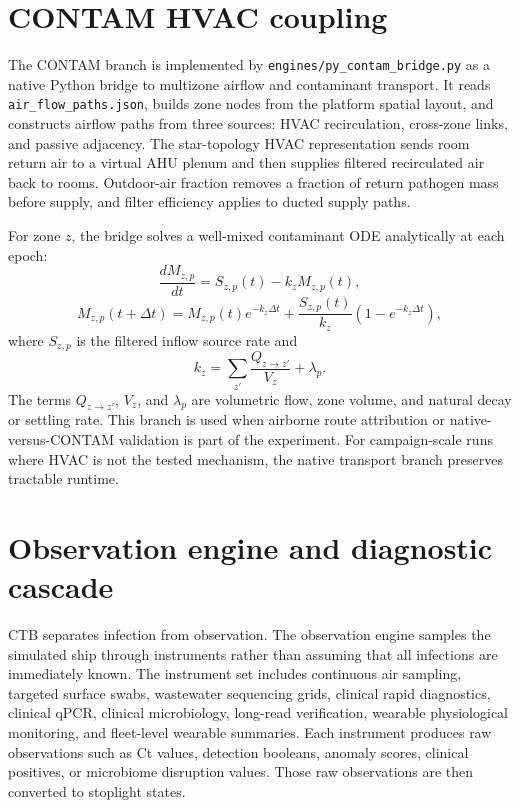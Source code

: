 \section{CONTAM HVAC coupling}
The CONTAM branch is implemented by \texttt{engines/py\_contam\_bridge.py} as a native Python bridge to multizone airflow and contaminant transport. It reads \texttt{air\_flow\_paths.json},
builds zone nodes from the platform spatial layout, and constructs airflow paths from three sources: HVAC recirculation, cross-zone links, and passive adjacency. The star-topology HVAC
representation sends room return air to a virtual AHU plenum and then supplies filtered recirculated air back to rooms. Outdoor-air fraction removes a fraction of return pathogen mass before
supply, and filter efficiency applies to ducted supply paths.

For zone $z$, the bridge solves a well-mixed contaminant ODE analytically at each epoch:
\begin{equation}
\frac{dM_{z,p}}{dt}=S_{z,p}(t)-k_z M_{z,p}(t),
\end{equation}
\begin{equation}
M_{z,p}(t+\Delta t)=M_{z,p}(t)e^{-k_z\Delta t}+\frac{S_{z,p}(t)}{k_z}
\left(1-e^{-k_z\Delta t}\right),
\label{eq:contam-ode}
\end{equation}
where $S_{z,p}$ is the filtered inflow source rate and
\begin{equation}
k_z=\sum_{z'}\frac{Q_{z\rightarrow z'}}{V_z}+\lambda_p.
\end{equation}
The terms $Q_{z\rightarrow z'}$, $V_z$, and $\lambda_p$ are volumetric flow, zone volume, and natural decay or settling rate. This branch is used when airborne route attribution or
native-versus-CONTAM validation is part of the experiment. For campaign-scale runs where HVAC is not the tested mechanism, the native transport branch preserves tractable runtime.

\section{Observation engine and diagnostic cascade}
CTB separates infection from observation. The observation engine samples the simulated ship through instruments rather than assuming that all infections are immediately known. The instrument
set includes continuous air sampling, targeted surface swabs, wastewater sequencing grids, clinical rapid diagnostics, clinical qPCR, clinical microbiology, long-read verification, wearable
physiological monitoring, and fleet-level wearable summaries. Each instrument produces raw observations such as Ct values, detection booleans, anomaly scores, clinical positives, or
microbiome disruption values. Those raw observations are then converted to stoplight states.

